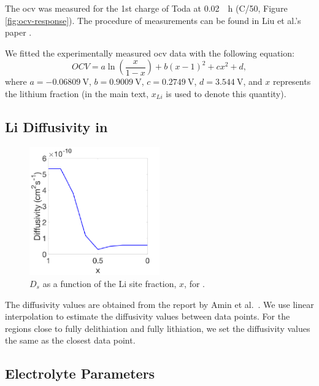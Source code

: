 \documentclass{article}
\begin{document}
The \gls{ocv} was measured for the 1st charge of Toda \nca{} at
\SI{0.02}{\per\hour} (C/50, Figure \ref{fig:ocv-response}). The
procedure of measurements can be found in Liu et al.'s
paper \cite{liu2017}.

We fitted the experimentally measured \gls{ocv} data with the
following equation:
\begin{equation}
  \mathit{OCV}=a\ln \left(\frac x{1-x}\right)+b\left(x-1\right)^2+cx^2+d,
  \label{eq:12}
\end{equation}
where $a=\SI{-0.06809}{\volt}$, $b=\SI{0.9009}{\volt}$,
$c=\SI{0.2749}{\volt}$, $d=\SI{3.544}{\volt}$, and $x$ represents the
lithium fraction (in the main text, $x_{Li}$ is used to denote this quantity).

\subsection{Li Diffusivity in \nca{}}

\begin{figure}
  \begin{center}
    \includegraphics[width=0.5\textwidth]{diffusivity.pdf}
  \end{center}
  \caption{$D_s$ as a function of the Li site fraction, $x$, for  \nca{} \cite{amin2015}.}
  \label{fig:diffusivity}
\end{figure}

The diffusivity values are obtained from the report by Amin et
al.\ \cite{amin2015}. We use linear interpolation to estimate the
diffusivity values between data points. For the regions close to
fully delithiation and fully lithiation, we set the diffusivity values
the same as the closest data point.

\subsection{Electrolyte Parameters}
\end{document}
